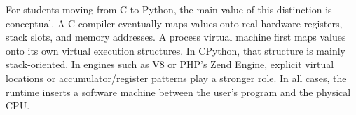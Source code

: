 For students moving from C to Python, the main value of this distinction is conceptual. A C compiler eventually maps values onto real hardware registers, stack slots, and memory addresses. A process virtual machine first maps values onto its own virtual execution structures. In CPython, that structure is mainly stack-oriented. In engines such as V8 or PHP's Zend Engine, explicit virtual locations or accumulator/register patterns play a stronger role. In all cases, the runtime inserts a software machine between the user's program and the physical CPU.


